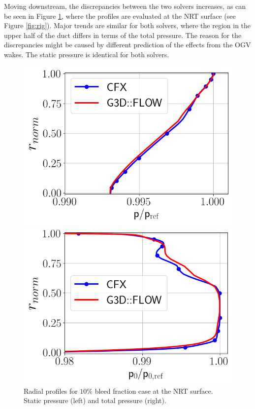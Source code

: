Moving downstream, the discrepancies between the two solvers increases, as can be seen in Figure \ref{fig:NRT10}, where the profiles are evaluated at the NRT surface (see Figure \ref{fig:rig}). Major trends are similar for both solvers, where the region in the upper half of the duct differs in terms of the total pressure. The reason for the discrepancies might be caused by different prediction of the effects from the OGV wakes. The static pressure is identical for both solvers.

\begin{figure}[h!]
  \centering
  \begin{minipage}{0.48\columnwidth}
  \includegraphics[width=1.\textwidth]{figures/PAaveB10_NRT.png}
  \end{minipage}
  \begin{minipage}{0.48\columnwidth}
  \includegraphics[width=1.\textwidth]{figures/P0MaveB10_NRT.png}
  \end{minipage}
  \caption{Radial profiles for $10\%$ bleed fraction case at the NRT surface. Static pressure (left) and total pressure (right).} \label{fig:NRT10}
\end{figure}
